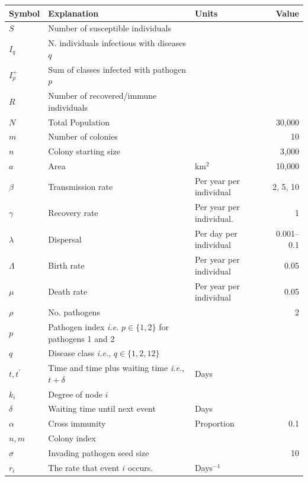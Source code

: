 \begin{table}[b!]
\begin{tabular}{@{}lp{5cm}p{3.9cm}r@{}}
\toprule
Symbol & Explanation & Units & Value\\
\midrule
$S$ & Number of susceptible individuals &&\\
$I_q$ & N. individuals infectious with diseases $q$ &&\\
$I^+_p$ & Sum of classes infected with pathogen $p$ &\\
$R$ & Number of recovered/immune individuals &&\\
$N$ & Total Population && 30,000\\
$m$ & Number of colonies&& 10\\
$n$ & Colony starting size && 3,000\\
$a$ & Area & km$^2$& 10,000\\
$\beta$ & Transmission rate & Per year per individual& 2, 5, 10\\
$\gamma$ & Recovery rate & Per year per individual. & 1\\
$\lambda$ & Dispersal & Per day per individual& 0.001--0.1\\
$\Lambda$ & Birth rate & Per year per individual& 0.05\\
$\mu$ & Death rate & Per year per individual & 0.05\\
$\rho$ & No. pathogens && 2\\
$p$ &  Pathogen index \emph{i.e.} $p\in\{1,2\}$ for pathogens 1 and 2 & &\\
$q$ & Disease class \emph{i.e.}, $q\in\{1,2,12\}$&\\
$t, t^\prime$ & Time and time plus waiting time \emph{i.e.}, $t+\delta$ & Days&\\
$k_i$ & Degree of node $i$ &&\\
$\delta$ & Waiting time until next event & Days&\\
$\alpha$ & Cross immunity & Proportion& 0.1\\
$n, m$ & Colony index &&\\
$\sigma$ & Invading pathogen seed size & & 10\\
$r_i$ & The rate that event $i$ occurs. & Days$^{-1}$&\\
\bottomrule
\end{tabular}

\label{t:params}
\end{table}




